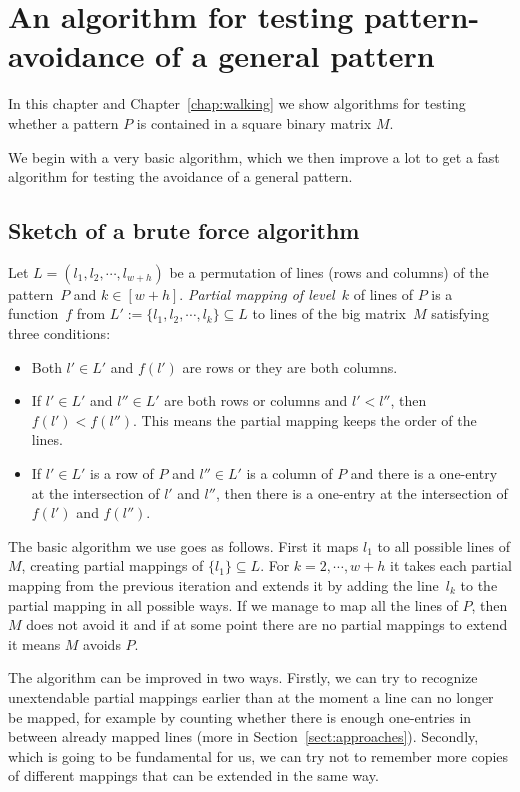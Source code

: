 \chapter{An algorithm for testing pattern-avoidance of a general pattern}
\label{chap:general}
In this chapter and Chapter~\ref{chap:walking} we show algorithms for testing whether a pattern $P$ is contained in a square binary matrix $M$.

We begin with a very basic algorithm, which we then improve a lot to get a fast algorithm for testing the avoidance of a general pattern.

\section{Sketch of a brute force algorithm}
Let $L=(l_1,l_2,\cdots,l_{w+h})$ be a permutation of lines (rows and columns) of the pattern~$P$ and $k\in[w+h]$. \emph{Partial mapping of level~$k$} of lines of $P$ is a function~$f$ from $L':=\{l_1,l_2,\cdots,l_k\}\subseteq L$ to lines of the big matrix~$M$ satisfying three conditions:
\begin{itemize}
\item Both $l'\in L'$ and $f(l')$ are rows or they are both columns.
\item If $l'\in L'$ and $l''\in L'$ are both rows or columns and $l'<l''$, then $f(l')<f(l'')$. This means the partial mapping keeps the order of the lines.
\item If $l'\in L'$ is a row of $P$ and $l''\in L'$ is a column of $P$ and there is a one-entry at the intersection of $l'$ and $l''$, then there is a one-entry at the intersection of $f(l')$ and $f(l'')$.
\end{itemize}
The basic algorithm we use goes as follows. First it maps $l_1$ to all possible lines of $M$, creating partial mappings of $\{l_1\}\subseteq L$. For $k=2,\cdots,w+h$ it takes each partial mapping from the previous iteration and extends it by adding the line~$l_k$ to the partial mapping in all possible ways. If we manage to map all the lines of $P$, then $M$ does not avoid it and if at some point there are no partial mappings to extend it means $M$ avoids $P$.

The algorithm can be improved in two ways. Firstly, we can try to recognize unextendable partial mappings earlier than at the moment a line can no longer be mapped, for example by counting whether there is enough one-entries in between already mapped lines (more in Section~\ref{sect:approaches}). Secondly, which is going to be fundamental for us, we can try not to remember more copies of different mappings that can be extended in the same way.

